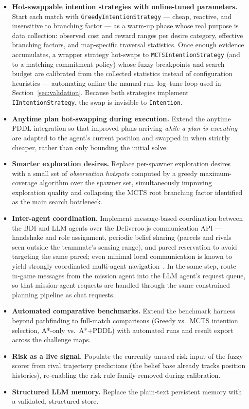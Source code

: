 \begin{itemize}
    \item \textbf{Hot-swappable intention strategies with online-tuned parameters.} Start each
    match with \texttt{GreedyIntentionStrategy} --- cheap, reactive, and insensitive to branching
    factor --- as a warm-up phase whose real purpose is data collection: observed cost and reward
    ranges per desire category, effective branching factors, and map-specific traversal
    statistics. Once enough evidence accumulates, a wrapper strategy hot-swaps to
    \texttt{MCTSIntentionStrategy} (and to a matching commitment policy) whose fuzzy breakpoints
    and search budget are calibrated from the collected statistics instead of configuration
    heuristics --- automating online the manual run--log--tune loop used in
    Section~\ref{sec:validation}. Because both strategies implement
    \texttt{IIntentionStrategy}, the swap is invisible to \texttt{Intention}.
    \item \textbf{Anytime plan hot-swapping during execution.} Extend the anytime PDDL
    integration so that improved plans arriving \emph{while a plan is executing} are adapted to
    the agent's current position and swapped in when strictly cheaper, rather than only bounding
    the initial solve.
    \item \textbf{Smarter exploration desires.} Replace per-spawner exploration desires with a
    small set of \emph{observation hotspots} computed by a greedy maximum-coverage algorithm
    over the spawner set, simultaneously improving exploration quality and collapsing the MCTS
    root branching factor identified as the main search bottleneck.
    \item \textbf{Inter-agent coordination.} Implement message-based coordination between the
    BDI and LLM agents over the Deliveroo.js communication API --- handshake and role assignment,
    periodic belief sharing (parcels and rivals seen outside the teammate's sensing range), and
    parcel reservation to avoid targeting the same parcel; even minimal local communication is
    known to yield strongly coordinated multi-agent navigation~\cite{hildreth2019}. In the same
    step, route in-game messages from the mission agent into the LLM agent's request queue, so
    that mission-agent requests are handled through the same constrained planning pipeline as
    chat requests.
    \item \textbf{Automated comparative benchmarks.} Extend the benchmark harness beyond
    pathfinding to full-match comparisons (Greedy vs.\ MCTS intention selection, A*-only vs.\
    A*+PDDL) with automated runs and result export across the challenge maps.
    \item \textbf{Risk as a live signal.} Populate the currently unused risk input of the fuzzy
    scorer from rival trajectory predictions (the belief base already tracks position
    histories), re-enabling the risk rule family removed during calibration.
    \item \textbf{Structured LLM memory.} Replace the plain-text persistent memory with a
    validated, structured store.
\end{itemize}
